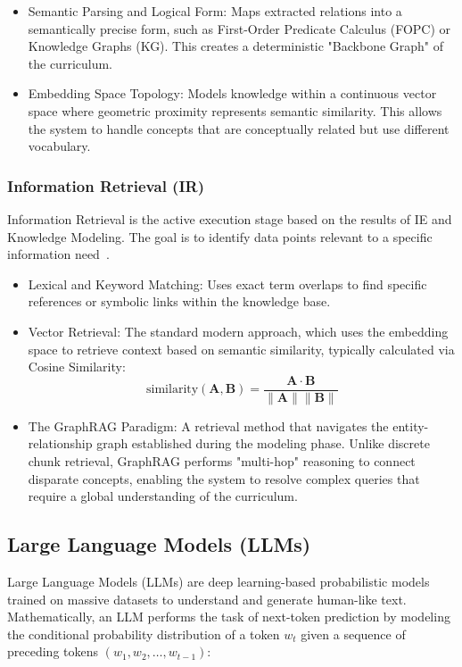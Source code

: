 \begin{itemize}
    \item {Semantic Parsing and Logical Form:} Maps extracted relations into a semantically precise form, such as First-Order Predicate Calculus (FOPC) or Knowledge Graphs (KG). This creates a deterministic "Backbone Graph" of the curriculum.
    \item {Embedding Space Topology:} Models knowledge within a continuous vector space where geometric proximity represents semantic similarity. This allows the system to handle concepts that are conceptually related but use different vocabulary.
\end{itemize}

\subsubsection*{Information Retrieval (IR)}
Information Retrieval is the active execution stage based on the results of IE and Knowledge Modeling. The goal is to identify data points relevant to a specific information need~\cite{StanfordNLP}.

\begin{itemize}
    \item {Lexical and Keyword Matching:} Uses exact term overlaps to find specific references or symbolic links within the knowledge base.
    \item {Vector Retrieval:} The standard modern approach, which uses the embedding space to retrieve context based on semantic similarity, typically calculated via Cosine Similarity:
    \begin{equation}
        \text{similarity}(\mathbf{A}, \mathbf{B}) = \frac{\mathbf{A} \cdot \mathbf{B}}{\|\mathbf{A}\| \|\mathbf{B}\|}
    \end{equation}
    \item {The GraphRAG Paradigm:} A retrieval method that navigates the entity-relationship graph established during the modeling phase. Unlike discrete chunk retrieval, GraphRAG performs "multi-hop" reasoning to connect disparate concepts, enabling the system to resolve complex queries that require a global understanding of the curriculum.
\end{itemize}


\subsection{Large Language Models (LLMs)}

Large Language Models (LLMs) are deep learning-based probabilistic models trained on massive datasets to understand and generate human-like text. Mathematically, an LLM performs the task of next-token prediction by modeling the conditional probability distribution of a token $w_{t}$ given a sequence of preceding tokens $(w_{1}, w_{2}, \dots, w_{t-1})$:

